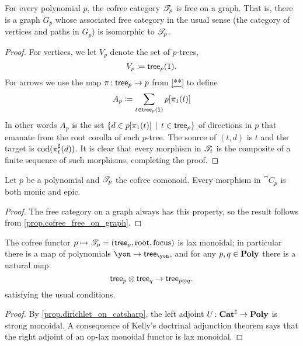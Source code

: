 \documentclass[Book-Poly]{subfiles}
\begin{document}
\begin{proposition}\label{prop.cofree_free_on_graph}
For every polynomial $p$, the cofree category $\mathscr{T}_{p}$ is free on a graph. That is, there is a graph $G_p$ whose associated free category in the usual sense (the category of vertices and paths in $G_p$) is isomorphic to $\mathscr{T}_{p}$.
\end{proposition}
\begin{proof}
For vertices, we let $V_p$ denote the set of $p$-trees,
\[V_p\coloneqq\mathsf{tree}_p(\textsf{1}).\]
For arrows we use the map $\pi\colon\mathsf{tree}_p\to p$ from \cref{**} to define
\[
A_p\coloneqq\sum_{t\in\mathsf{tree}_p(\textsf{1})}p[\pi_1(t)]
\]
In other words $A_p$ is the set $\{d\in p[\pi_1(t)]\,\mid\,t\in\mathsf{tree}_p\}$ of directions in $p$ that emanate from the root corolla of each $p$-tree. The source of $(t,d)$ is $t$ and the target is $\operatorname{cod}(\pi^\sharp_t(d))$. It is clear that every morphism in $\mathscr{T}_{t}$ is the composite of a finite sequence of such morphisms, completing the proof.
\end{proof}


\begin{corollary}
Let $p$ be a polynomial and $\mathscr{T}_{p}$ the cofree comonoid. Every morphism in $\cat{C}_p$ is both monic and epic.
\end{corollary}
\begin{proof}
The free category on a graph always has this property, so the result follows from \cref{prop.cofree_free_on_graph}.
\end{proof}

\begin{proposition}\label{prop.cofree_lax_monoidal}
The cofree functor $p\mapsto\mathscr{T}_{p}=(\mathsf{tree}_p,\mathrm{root},\mathrm{focus})$ is lax monoidal; in particular there is a map of polynomials $\yon\to\tr_\yon$, and for any $p,q\in\mathbf{Poly}$ there is a natural map
\[
	\mathsf{tree}_p\otimes\mathsf{tree}_q\to\mathsf{tree}_{p\otimes q}.
\]
satisfying the usual conditions.
\end{proposition}
\begin{proof}
By \cref{prop.dirichlet_on_catsharp}, the left adjoint $U\colon\mathbf{Cat}^\sharp\to\mathbf{Poly}$ is strong monoidal. A consequence of Kelly's doctrinal adjunction theorem \cite{kelly1974doctrinal} says that the right adjoint of an op-lax monoidal functor is lax monoidal.
\end{proof}
\end{document}
